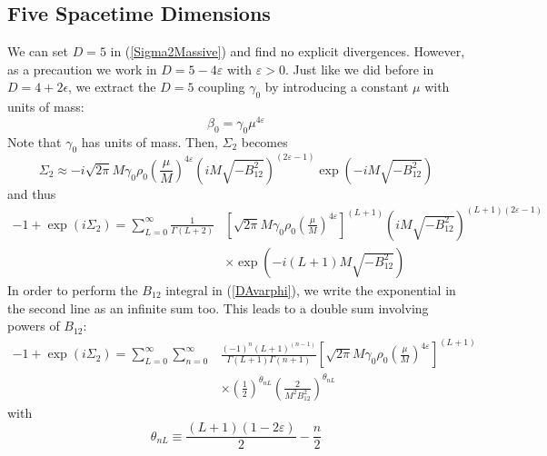 \subsection{Five Spacetime Dimensions}
We can set $D = 5$ in (\ref{Sigma2Massive}) and find no explicit divergences. However, as a precaution we work in $D = 5 - 4 \varepsilon$ with $\varepsilon > 0$. Just like we did before in $D = 4 + 2 \epsilon$, we extract the $D = 5$ coupling $\gamma_{0}$ by introducing a constant $\mu$ with units of mass:
\begin{equation}
	\beta_{0} = \gamma_{0} \mu^{4 \varepsilon}
\end{equation}
Note that $\gamma_{0}$ has units of mass. Then, $\Sigma_{2}$ becomes
\begin{equation}
	\Sigma_{2} \approx -i \sqrt{2 \pi} M\gamma_{0} \rho_{0} \left( \frac{\mu}{M} \right)^{4\varepsilon} \left(i M \sqrt{-B_{12}^{2}}\right)^{(2\varepsilon - 1)} \exp{\left(- i M \sqrt{-B_{12}^{2}}\right)}
\end{equation}
and thus
\begin{equation}
\begin{split}
	{-1} + \exp{(i \Sigma_{2})} = \sum_{L = 0}^{\infty} \frac{1}{\Gamma(L + 2)} {}& \left[ \sqrt{2 \pi} M \gamma_{0} \rho_{0} \left( \frac{\mu}{M} \right)^{4\varepsilon} \right]^{(L+1)} \left(i M \sqrt{-B_{12}^{2}}\right)^{(L+1)(2\varepsilon - 1)} \\
	&\times \exp{\left(- i (L+1) M \sqrt{-B_{12}^{2}}\right)}
\end{split}
\end{equation}
In order to perform the $B_{12}$ integral in (\ref{DAvarphi}), we write the exponential in the second line as an infinite sum too. This leads to a double sum involving powers of $B_{12}$:
\begin{equation}
\begin{split}
	{-1} + \exp{(i \Sigma_{2})} = \sum_{L = 0}^{\infty} \sum_{n = 0}^{\infty} {}& \frac{(-1)^{n}(L+1)^{(n - 1)}}{\Gamma(L + 1)\Gamma(n+1)} \left[ \sqrt{2 \pi} M \gamma_{0} \rho_{0} \left( \frac{\mu}{M} \right)^{4\varepsilon} \right]^{(L+1)} \\
	&\times \left(\frac{1}{2}\right)^{\theta_{nL}} \left( \frac{2}{M^{2} B_{12}^{2}} \right)^{\theta_{nL}}
\end{split}
\end{equation}
with
\begin{equation}
	\theta_{nL} \equiv \frac{(L+1)(1 - 2\varepsilon)}{2} - \frac{n}{2}
\end{equation}
